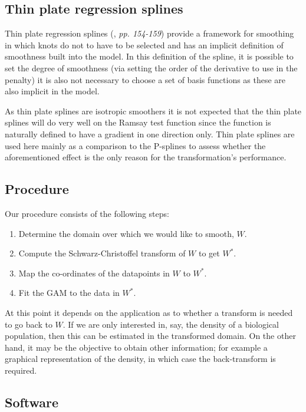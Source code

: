 \documentclass[a4paper,10pt]{amsart}
\newcommand{\sch}{Schwarz-Christoffel }
\begin{document}
\subsection{Thin plate regression splines}
Thin plate regression splines (\cite{simonbook}, \emph{pp. 154-159}) provide a framework for smoothing in which knots do not to have to be selected and has an implicit definition of smoothness built into the model. In this definition of the spline, it is possible to set the degree of smoothness (via setting the order of the derivative to use in the penalty) it is also not necessary to choose a set of basis functions as these are also implicit in the model. 

As thin plate splines are isotropic smoothers it is not expected that the thin plate splines will do very well on the Ramsay test function since the function is naturally defined to have a gradient in one direction only. Thin plate splines are used here mainly as a comparison to the P-splines to assess whether the aforementioned effect is the only reason for the transformation's performance.

\subsection{Procedure}

Our procedure consists of the following steps:

\begin{enumerate}
\item Determine the domain over which we would like to smooth, $W$.

\item Compute the \sch transform of $W$ to get $W^*$.

\item Map the co-ordinates of the datapoints in $W$ to $W^*$.

\item Fit the GAM to the data in $W^*$.
\end{enumerate}

At this point it depends on the application as to whether a transform is needed to go back to $W$. If we are only interested in, say, the density of a biological population, then this can be estimated in the transformed domain. On the other hand, it may be the objective to obtain other information; for example a graphical representation of the density, in which case the back-transform is required.

\subsection{Software}
\end{document}
